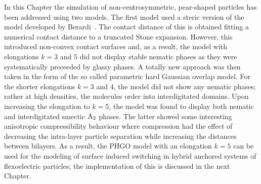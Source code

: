 \conclusion


In this Chapter the simulation of non-centrosymmetric, pear-shaped particles has been addressed
using two models. The first model used a steric version of the model developed by 
Berardi~\etal\cite{BerardiRicci01}.
The contact distance of this is obtained fitting a numerical contact distance
to a truncated Stone expansion. However, this introduced non-convex contact surfaces and, 
as a result, the model with
elongations $k=3$ and $5$ did not display stable nematic phases as they were systematically 
preceeded by glassy phases. A totally new approach was then taken in the form of the  so called
parametric hard Gaussian overlap model. For the shorter elongations $k=3$ and $4$, the model
did not show any nematic phases; rather at high densities, the molecules order into
interdigitated domains. 
Upon increasing the elongation to $k=5$, the model was found to display both
nematic and interdigitated smectic $\mathrm{A_2}$ phases. The latter showed some interesting
anisotropic compressibility behaviour where compression had the effect of decreasing the
intra-layer particle separation while increasing the distances between bilayers. As a result, 
the PHGO model with an elongation $k=5$ can be used for the modeling of surface induced 
switching in hybrid anchored systems of flexoelectric particles; the implementation of this 
is discussed in the next Chapter.







